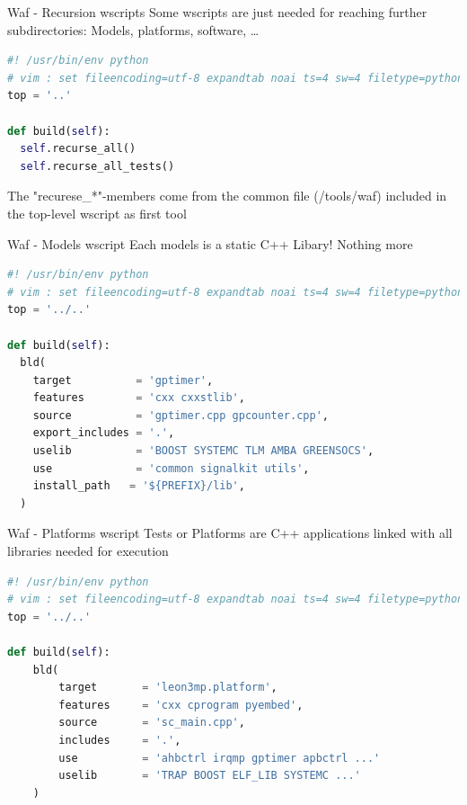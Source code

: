 \documentclass[fleqn,11pt,aspectratio=43]{beamer}
\begin{document}
\begin{frame}[fragile]{Waf - Recursion wscripts}
Some wscripts are just needed for reaching further subdirectories:
Models, platforms, software, …
  
\begin{lstlisting}[language=python]
#! /usr/bin/env python
# vim : set fileencoding=utf-8 expandtab noai ts=4 sw=4 filetype=python :
top = '..'

def build(self):
  self.recurse_all()
  self.recurse_all_tests()
\end{lstlisting}
The "recurese\_*"-members come from the common file (/tools/waf) included in the top-level wscript as first tool
\end{frame}

\begin{frame}[fragile]{Waf - Models wscript}
Each models is a static C++ Libary! Nothing more  
  
\begin{lstlisting}[language=python]
#! /usr/bin/env python
# vim : set fileencoding=utf-8 expandtab noai ts=4 sw=4 filetype=python :
top = '../..'

def build(self):
  bld(
    target          = 'gptimer',
    features        = 'cxx cxxstlib',
    source          = 'gptimer.cpp gpcounter.cpp',
    export_includes = '.',
    uselib          = 'BOOST SYSTEMC TLM AMBA GREENSOCS',
    use             = 'common signalkit utils',
    install_path   = '${PREFIX}/lib',
  )
\end{lstlisting}
\end{frame}

\begin{frame}[fragile]{Waf - Platforms wscript}
Tests or Platforms are C++ applications linked with all libraries needed for execution
  
\begin{lstlisting}[language=python]
#! /usr/bin/env python
# vim : set fileencoding=utf-8 expandtab noai ts=4 sw=4 filetype=python :
top = '../..'

def build(self):
    bld(
        target       = 'leon3mp.platform',
        features     = 'cxx cprogram pyembed',
        source       = 'sc_main.cpp',
        includes     = '.',
        use          = 'ahbctrl irqmp gptimer apbctrl ...'
        uselib       = 'TRAP BOOST ELF_LIB SYSTEMC ...'
    )
\end{lstlisting}
\end{frame}
\end{document}
